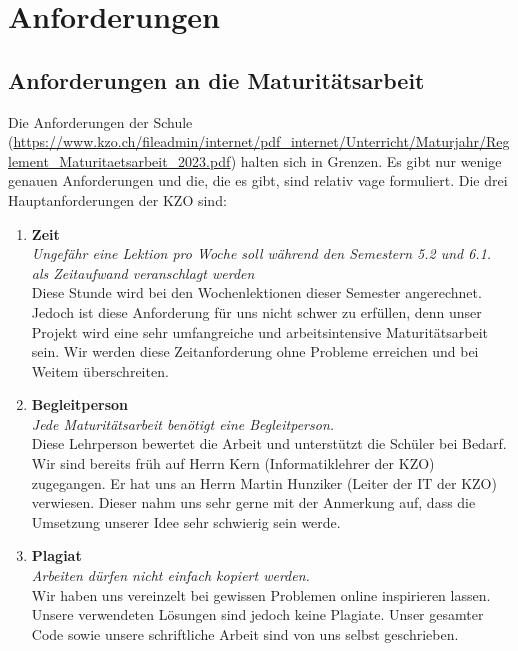\chapter{Anforderungen}

\section{Anforderungen an die Maturitätsarbeit}
Die Anforderungen der Schule (\url{https://www.kzo.ch/fileadmin/internet/pdf_internet/Unterricht/Maturjahr/Reglement_Maturitaetsarbeit_2023.pdf}) halten sich in Grenzen. Es gibt nur wenige genauen Anforderungen
und die, die es gibt, sind relativ vage formuliert. Die drei Hauptanforderungen der KZO sind:
\begin{enumerate}
    \item \textbf{Zeit} \\
        \textit{Ungefähr eine Lektion pro Woche soll während den Semestern 5.2 und 6.1. als Zeitaufwand veranschlagt werden}\\Diese Stunde wird bei den Wochenlektionen dieser Semester angerechnet.
        Jedoch ist diese Anforderung für uns nicht schwer zu erfüllen, denn unser Projekt wird eine sehr umfangreiche und arbeitsintensive Maturitätsarbeit sein.
        Wir werden diese Zeitanforderung ohne Probleme erreichen und bei Weitem überschreiten.
    \item \textbf{Begleitperson} \\
        \textit{Jede Maturitätsarbeit benötigt eine Begleitperson. }\\Diese Lehrperson bewertet die Arbeit und unterstützt die Schüler bei Bedarf.
        Wir sind bereits früh auf Herrn Kern (Informatiklehrer der KZO) zugegangen.
        Er hat uns an Herrn Martin Hunziker (Leiter der IT der KZO) verwiesen. Dieser nahm uns sehr gerne mit der Anmerkung auf, dass die Umsetzung unserer Idee sehr schwierig sein werde.
    \item \textbf{Plagiat} \\
        \textit{Arbeiten dürfen nicht einfach kopiert werden. }\\Wir haben uns vereinzelt bei gewissen Problemen online inspirieren lassen. Unsere verwendeten Lösungen sind jedoch keine Plagiate.
        Unser gesamter Code sowie unsere schriftliche Arbeit sind von uns selbst geschrieben.
\end{enumerate}

